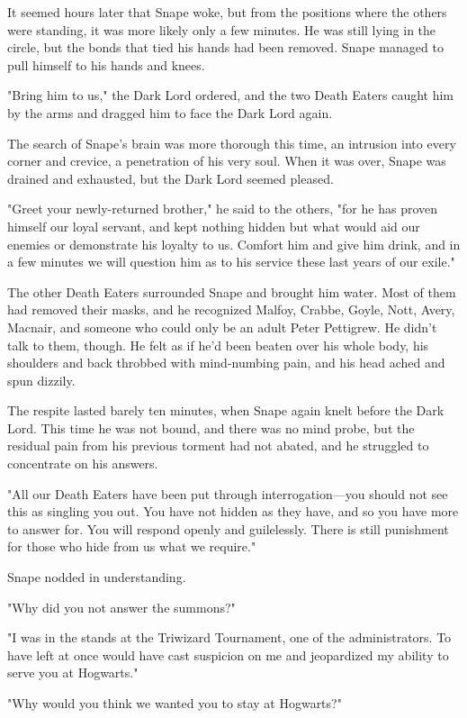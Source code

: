 It seemed hours later that Snape woke, but from the positions where the others were standing, it was more likely only a few minutes. He was still lying in the circle, but the bonds that tied his hands had been removed. Snape managed to pull himself to his hands and knees.

"Bring him to us," the Dark Lord ordered, and the two Death Eaters caught him by the arms and dragged him to face the Dark Lord again.

The search of Snape's brain was more thorough this time, an intrusion into every corner and crevice, a penetration of his very soul. When it was over, Snape was drained and exhausted, but the Dark Lord seemed pleased.

"Greet your newly-returned brother," he said to the others, "for he has proven himself our loyal servant, and kept nothing hidden but what would aid our enemies or demonstrate his loyalty to us. Comfort him and give him drink, and in a few minutes we will question him as to his service these last years of our exile."

The other Death Eaters surrounded Snape and brought him water. Most of them had removed their masks, and he recognized Malfoy, Crabbe, Goyle, Nott, Avery, Macnair, and someone who could only be an adult Peter Pettigrew. He didn't talk to them, though. He felt as if he'd been beaten over his whole body, his shoulders and back throbbed with mind-numbing pain, and his head ached and spun dizzily.

The respite lasted barely ten minutes, when Snape again knelt before the Dark Lord. This time he was not bound, and there was no mind probe, but the residual pain from his previous torment had not abated, and he struggled to concentrate on his answers.

"All our Death Eaters have been put through interrogation—you should not see this as singling you out. You have not hidden as they have, and so you have more to answer for. You will respond openly and guilelessly. There is still punishment for those who hide from us what we require."

Snape nodded in understanding.

"Why did you not answer the summons?"

"I was in the stands at the Triwizard Tournament, one of the administrators. To have left at once would have cast suspicion on me and jeopardized my ability to serve you at Hogwarts."

"Why would you think we wanted you to stay at Hogwarts?"

